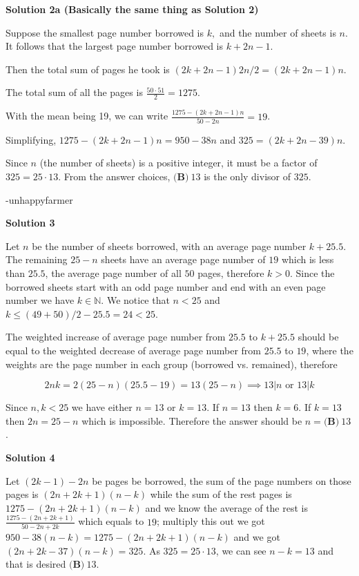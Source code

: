 \begin{enumerate}
 



\textbf{Solution 2a (Basically the same thing as Solution 2)}

Suppose the smallest page number borrowed is $k,$ and the number of sheets is $n$. It follows that the largest page number borrowed is $k+2n-1.$

 Then the total sum of pages he took is $(2k + 2n - 1)2n/2 = (2k + 2n - 1)n$. 

 The total sum of all the pages is $\frac{50\cdot51}{2} = 1275$. 

 With the mean being 19, we can write $\frac{1275 - (2k + 2n - 1)n}{50 - 2n} = 19$. 

 Simplifying, $1275 - (2k + 2n - 1)n = 950 - 38n$ and $325 = (2k + 2n - 39)n$.

 Since $n$ (the number of sheets) is a positive integer, it must be a factor of $325 = 25\cdot13$. From the answer choices, $\boxed{\textbf{(B)} ~13}$ is the only divisor of $325$.

 -unhappyfarmer

 



\textbf{Solution 3}

Let $n$ be the number of sheets borrowed, with an average page number $k+25.5$. The remaining $25-n$ sheets have an average page number of $19$ which is less than $25.5$, the average page number of all $50$ pages, therefore $k>0$. Since the borrowed sheets start with an odd page number and end with an even page number we have $k \in \mathbb N$. We notice that $n < 25$ and $k \le (49+50)/2-25.5=24<25$.

 The weighted increase of average page number from $25.5$ to $k+25.5$ should be equal to the weighted decrease of average page number from $25.5$ to $19$, where the weights are the page number in each group (borrowed vs. remained), therefore

 
 \[2nk=2(25-n)(25.5-19)=13(25-n) \implies 13 | n \text{ or } 13 | k\]

 Since $n, k < 25$ we have either $n=13$ or $k=13$. If $n=13$ then $k=6$. If $k=13$ then $2n=25-n$ which is impossible. Therefore the answer should be $n=\boxed{\textbf{(B)} ~13}$.

 



\textbf{Solution 4}

Let $(2k-1)-2n$ be pages be borrowed, the sum of the page numbers on those pages is $(2n+2k+1)(n-k)$ while the sum of the rest pages is $1275-(2n+2k+1)(n-k)$ and we know the average of the rest is $\frac{1275-(2n+2k+1)}{50-2n+2k}$ which equals to $19$; multiply this out we got $950-38(n-k)=1275-(2n+2k+1)(n-k)$ and we got $(2n+2k-37)(n-k)=325$. As $325=25\cdot13$, we can see $n-k=13$ and that is desired $\boxed{\textbf{(B)} ~13}$.


\end{enumerate}
